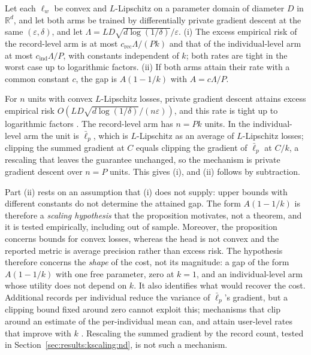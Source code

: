 \begin{proposition}
\label{prop:scaling}
Let each $\ell_w$ be convex and $L$-Lipschitz on a parameter domain of diameter
$D$ in $\mathbb{R}^d$, and let both arms be trained by differentially private
gradient descent at the same $(\varepsilon,\delta)$, and let
$\Lambda = LD\sqrt{d\log(1/\delta)}/\varepsilon$.
(i) The excess empirical risk of the record-level arm is at most
$c_{\mathrm{rec}}\Lambda/(Pk)$ and that of the individual-level arm at most
$c_{\mathrm{ind}}\Lambda/P$, with constants independent of $k$; both rates are
tight in the worst case up to logarithmic factors. (ii) If both arms attain their rate with a common
constant $c$, the gap is $A(1 - 1/k)$ with $A = c\Lambda/P$.
\end{proposition}

\begin{IEEEproof}
For $n$ units with convex $L$-Lipschitz losses, private gradient descent attains
excess empirical risk $O(LD\sqrt{d\log(1/\delta)}/(n\varepsilon))$, and this rate
is tight up to logarithmic factors \cite{ref31}. The record-level arm has $n = Pk$ units. In the
individual-level arm the unit is $\bar\ell_p$, which is $L$-Lipschitz as an
average of $L$-Lipschitz losses; clipping the summed gradient at $C$ equals
clipping the gradient of $\bar\ell_p$ at $C/k$, a rescaling that leaves the
guarantee unchanged, so the mechanism is private gradient descent over $n = P$
units. This gives (i), and (ii) follows by subtraction.
\end{IEEEproof}

Part (ii) rests on an assumption that (i) does not supply: upper bounds with
different constants do not determine the attained gap. The form $A(1-1/k)$ is
therefore a \emph{scaling hypothesis} that the proposition motivates, not a
theorem, and it is tested empirically, including out of sample. Moreover, the
proposition concerns bounds for convex losses, whereas the head is not convex
and the reported metric is average precision rather than excess risk. The
hypothesis therefore concerns the \emph{shape} of the cost, not its magnitude:
a gap of the form $A(1 - 1/k)$ with one free parameter, zero at $k = 1$, and an
individual-level arm whose utility does not depend on $k$. It also identifies
what would recover the cost. Additional records per individual reduce the
variance of $\bar\ell_p$'s gradient, but a clipping bound fixed around zero
cannot exploit this; mechanisms that clip around an estimate of the
per-individual mean can, and attain user-level rates that improve with $k$
\cite{ref32}. Rescaling the summed gradient by the record count, tested in
Section~\ref{sec:results:kscaling:nd}, is not such a mechanism.

